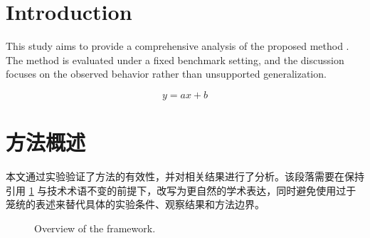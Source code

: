 \documentclass{article}
\begin{document}
\section{Introduction}\label{sec:intro}

This study aims to provide a comprehensive analysis of the proposed method \cite{smith2024}. The method is evaluated under a fixed benchmark setting, and the discussion focuses on the observed behavior rather than unsupported generalization.

\begin{equation}
    y = ax + b
\end{equation}

\section{方法概述}\label{sec:method}

本文通过实验验证了方法的有效性，并对相关结果进行了分析。该段落需要在保持引用 \ref{sec:intro} 与技术术语不变的前提下，改写为更自然的学术表达，同时避免使用过于笼统的表述来替代具体的实验条件、观察结果和方法边界。

\begin{figure}
    \centering
    \caption{Overview of the framework.}
    \label{fig:overview}
\end{figure}
\end{document}

